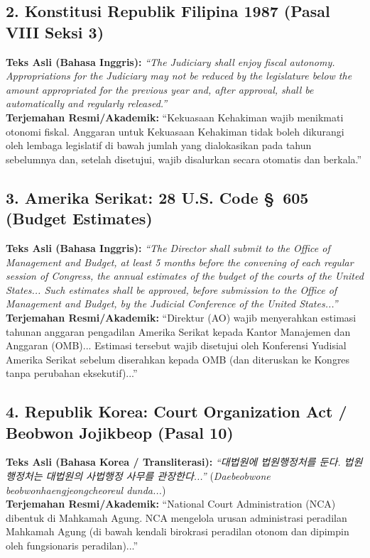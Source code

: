\documentclass[12pt, a4paper]{article}
\begin{document}
\subsection*{2. Konstitusi Republik Filipina 1987 (Pasal VIII Seksi 3)}
\noindent\textbf{Teks Asli (Bahasa Inggris):}
\textit{``The Judiciary shall enjoy fiscal autonomy. Appropriations for the Judiciary may not be reduced by the legislature below the amount appropriated for the previous year and, after approval, shall be automatically and regularly released.''}
\\[0.3em]
\noindent\textbf{Terjemahan Resmi/Akademik:}
``Kekuasaan Kehakiman wajib menikmati otonomi fiskal. Anggaran untuk Kekuasaan Kehakiman tidak boleh dikurangi oleh lembaga legislatif di bawah jumlah yang dialokasikan pada tahun sebelumnya dan, setelah disetujui, wajib disalurkan secara otomatis dan berkala.''

\subsection*{3. Amerika Serikat: 28 U.S. Code \S~605 (Budget Estimates)}
\noindent\textbf{Teks Asli (Bahasa Inggris):}
\textit{``The Director shall submit to the Office of Management and Budget, at least 5 months before the convening of each regular session of Congress, the annual estimates of the budget of the courts of the United States... Such estimates shall be approved, before submission to the Office of Management and Budget, by the Judicial Conference of the United States...''}
\\[0.3em]
\noindent\textbf{Terjemahan Resmi/Akademik:}
``Direktur (AO) wajib menyerahkan estimasi tahunan anggaran pengadilan Amerika Serikat kepada Kantor Manajemen dan Anggaran (OMB)... Estimasi tersebut wajib disetujui oleh Konferensi Yudisial Amerika Serikat sebelum diserahkan kepada OMB (dan diteruskan ke Kongres tanpa perubahan eksekutif)...''

\subsection*{4. Republik Korea: Court Organization Act / Beobwon Jojikbeop (Pasal 10)}
\noindent\textbf{Teks Asli (Bahasa Korea / Transliterasi):}
\textit{``대법원에 법원행정처를 둔다. 법원행정처는 대법원의 사법행정 사무를 관장한다...''} (\textit{Daebeobwone beobwonhaengjeongcheoreul dunda...})
\\[0.3em]
\noindent\textbf{Terjemahan Resmi/Akademik:}
``National Court Administration (NCA) dibentuk di Mahkamah Agung. NCA mengelola urusan administrasi peradilan Mahkamah Agung (di bawah kendali birokrasi peradilan otonom dan dipimpin oleh fungsionaris peradilan)...''
\end{document}
